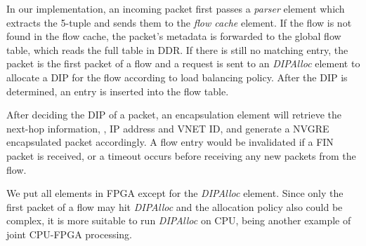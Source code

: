 In our implementation, an incoming packet first passes a \textit{parser} element 
which extracts the 5-tuple and sends them to the \textit{flow cache} element.
If the flow is not found in the flow cache, the packet's metadata is forwarded
to the global flow table, which reads the full table in DDR.
%
If there is still no matching entry, the packet is the first packet of a flow and 
a request is sent to an \textit{DIPAlloc} element to allocate a DIP for the flow 
according to load balancing policy.
After the DIP is determined, an entry is inserted into the flow table. 

After deciding the DIP of a packet, an encapsulation element will 
retrieve the next-hop information, \eg, IP address and VNET ID, and 
generate a NVGRE encapsulated packet accordingly. 
%
A flow entry would be invalidated if a FIN packet is received, or a timeout occurs
before receiving any new packets from the flow.

We put all elements in FPGA except for the \textit{DIPAlloc} element.
Since only the first packet of a flow may hit \textit{DIPAlloc} and the allocation policy also could be complex, it is more suitable to run 
\textit{DIPAlloc} on CPU, being another example of joint CPU-FPGA processing.
%

